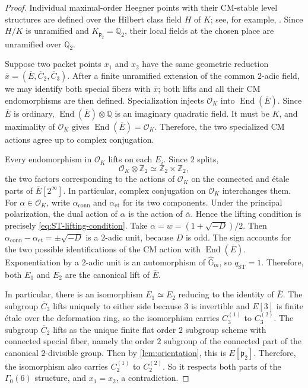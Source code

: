 \documentclass[11pt]{amsart}
\theoremstyle{remark}
\numberwithin{equation}{section}
\newcommand{\Q}{\mathbb Q}
\newcommand{\Z}{\mathbb Z}
\newcommand{\cO}{\mathcal O}
\newcommand{\End}{\operatorname{End}}
\begin{document}
\begin{proof}
 Individual maximal-order Heegner points with their CM-stable level
 structures are defined over the Hilbert class field $H$ of $K$; see, for
 example, \cite{GrossX0N}.  Since $H/K$ is unramified and
 $K_{\mathfrak p_2}=\Q_2$, their local fields at the chosen place are
 unramified over $\Q_2$.

 Suppose two packet points $x_1$ and $x_2$ have the same geometric reduction
 $\overline x=(\overline E,\overline C_2,\overline C_3)$.  After a finite
 unramified extension of the common $2$-adic field, we may identify both
 special fibers with $\overline x$; both lifts and all their CM endomorphisms
 are then defined.  Specialization injects $\cO_K$ into
 $\End(\overline E)$.  Since $\overline E$ is ordinary,
 $\End(\overline E)\otimes\Q$ is an imaginary quadratic field.  It must be
 $K$, and maximality of $\cO_K$ gives $\End(\overline E)=\cO_K$.  Therefore, the two
 specialized CM actions agree up to complex conjugation.

 Every endomorphism in $\cO_K$ lifts on each $E_i$.  Since $2$ splits,
 \[
  \cO_K\otimes\Z_2\simeq\Z_2\times\Z_2,
 \]
 the two factors corresponding to the actions of $\cO_K$ on the connected
 and \'etale parts of $\overline E[2^\infty]$.  In particular, complex conjugation on
 $\cO_K$ interchanges them.  For $\alpha\in\cO_K$, write
 $\alpha_{\mathrm{conn}}$ and $\alpha_{\mathrm{et}}$ for its two components.
 Under the principal polarization, the dual action of $\alpha$ is the action
 of $\overline\alpha$.  Hence the lifting condition is precisely
 \eqref{eq:ST-lifting-condition}.
 Take $\alpha=w=(1+\sqrt{-D})/2$.  Then
 $\alpha_{\mathrm{conn}}-\alpha_{\mathrm{et}}=\pm\sqrt{-D}$ is a
 $2$-adic unit, because $D$ is odd. The sign accounts for the two possible
 identifications of the CM action with $\End(\overline E)$.
 Exponentiation by a $2$-adic unit is an automorphism of
 $\widehat{\mathbb G}_m$, so $q_{\mathrm{ST}}=1$.  Therefore, both $E_1$ and
 $E_2$ are the canonical lift of $\overline E$.

 In particular, there is an isomorphism $E_1\simeq E_2$ reducing to the
 identity of $\overline E$.  The subgroup $\overline C_3$ lifts uniquely to
 either side because $3$ is invertible and
 $E[3]$ is finite \'etale over the deformation ring, so the isomorphism
 carries $C_3^{(1)}$ to $C_3^{(2)}$.  The subgroup
 $\overline C_2$ lifts as the unique finite flat order $2$ subgroup scheme with
 connected special fiber, namely the order $2$ subgroup of the connected
 part of the canonical $2$-divisible group. Then by \cref{lem:orientation}, this
 is $E[\mathfrak p_2]$.  Therefore, the isomorphism also carries
 $C_2^{(1)}$ to $C_2^{(2)}$.  So it respects both parts of the
 $\Gamma_0(6)$ structure, and $x_1=x_2$, a contradiction.
\end{proof}
\end{document}
